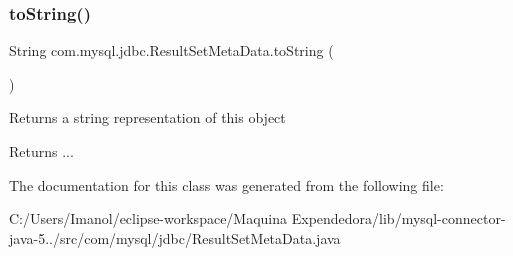 \subsubsection{\texorpdfstring{to\+String()}{toString()}}
{\footnotesize\ttfamily String com.\+mysql.\+jdbc.\+Result\+Set\+Meta\+Data.\+to\+String (\begin{DoxyParamCaption}{ }\end{DoxyParamCaption})}

Returns a string representation of this object

\begin{DoxyReturn}{Returns}
... 
\end{DoxyReturn}


The documentation for this class was generated from the following file\+:\begin{DoxyCompactItemize}
\item 
C\+:/\+Users/\+Imanol/eclipse-\/workspace/\+Maquina Expendedora/lib/mysql-\/connector-\/java-\/5../src/com/mysql/jdbc/Result\+Set\+Meta\+Data.\+java\end{DoxyCompactItemize}
